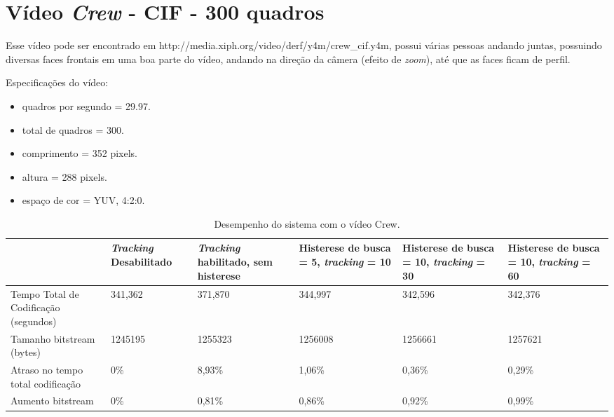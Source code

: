 \section{ Vídeo \textit{Crew} - CIF - 300 quadros }


Esse vídeo pode ser encontrado em http://media.xiph.org/video/derf/y4m/crew\_cif.y4m, possui várias pessoas andando juntas, possuindo diversas faces frontais em uma boa parte do vídeo, andando na direção da câmera (efeito de \textit{zoom}), até que as faces ficam de perfil.


Especificações do vídeo:

\begin{itemize}
        \item quadros por segundo = 29.97.
        \item total de quadros    = 300.
        \item comprimento         = 352 pixels.
        \item altura              = 288 pixels.
        \item espaço de cor       = YUV, 4:2:0.
\end{itemize}


\begin{table}[H]
\begin{center}
\begin{tabular}{|p{2.3cm}|p{2.3cm}|p{2.3cm}|p{2.3cm}|p{2.3cm}|p{2.3cm}|}
\hline
\textbf{} & \textbf{\textit{Tracking} Desabilitado} & \textbf{\textit{Tracking} habilitado, sem histerese} & \textbf{Histerese de busca = 5, \textit{tracking} = 10} & \textbf{Histerese de busca = 10, \textit{tracking} = 30} & \textbf{Histerese de busca = 10, \textit{tracking} = 60} \\
\hline
Tempo Total de Codificação (segundos) & 341,362 & 371,870 & 344,997 & 342,596 & 342,376 \\
\hline
Tamanho bitstream (bytes) & 1245195 & 1255323 & 1256008 & 1256661 & 1257621 \\
\hline
Atraso no tempo total codificação & 0\% & 8,93\% & 1,06\% & 0,36\% & 0,29\% \\
\hline
Aumento bitstream  & 0\% & 0,81\% & 0,86\% & 0,92\% & 0,99\% \\
\hline
\end{tabular}
\caption{Desempenho do sistema com o vídeo Crew.}
\label{tab:space_overhead}
\end{center}
\end{table}


